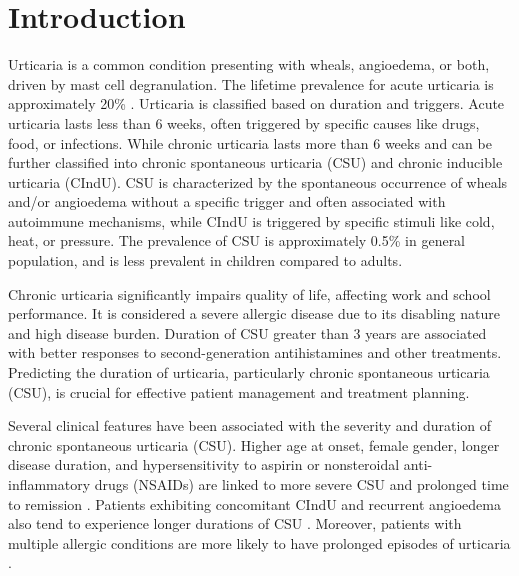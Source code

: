 \documentclass[final,3p,times,authoryear]{elsarticle}
\begin{document}
\sloppy %

\section{Introduction}\label{Introduction}

Urticaria is a common condition presenting with wheals, angioedema, or both, driven by mast cell degranulation\citep{Zuberbier2021The,RadonjicHoesli2018Urticaria,Ring2012Urticaria}. The lifetime prevalence for acute urticaria is approximately 20\% \citep{Zuberbier2021The}. Urticaria is classified based on duration and triggers. Acute urticaria lasts less than 6 weeks, often triggered by specific causes like drugs, food, or infections. While chronic urticaria lasts more than 6 weeks and can be further classified into chronic spontaneous urticaria (CSU) and chronic inducible urticaria (CIndU)\citep{Zuberbier2021The,Ring2012Urticaria}. CSU is characterized by the spontaneous occurrence of wheals and/or angioedema without a specific trigger and often associated with autoimmune mechanisms\citep{Schettini2023Urticaria}, while CIndU is triggered by specific stimuli like cold, heat, or pressure\citep{Pozderac2020Chronic}. The prevalence of CSU is approximately 0.5\% in general population, and is less prevalent in children compared to adults\citep{Balp2015The, Poddighe2019LETTER, Labbene2023Prevalence}. 

Chronic urticaria significantly impairs quality of life, affecting work and school performance. It is considered a severe allergic disease due to its disabling nature and high disease burden\citep{Zuberbier2021The}. Duration of CSU greater than 3 years are associated with better responses to second-generation antihistamines and other treatments\citep{Chiang2022Predictors}. Predicting the duration of urticaria, particularly chronic spontaneous urticaria (CSU), is crucial for effective patient management and treatment planning. 

Several clinical features have been associated with the severity and duration of chronic spontaneous urticaria (CSU). Higher age at onset, female gender, longer disease duration, and hypersensitivity to aspirin or nonsteroidal anti-inflammatory drugs (NSAIDs) are linked to more severe CSU and prolonged time to remission \citep{SanchezBorges2017Factors,Rabelo-Filardi2013Parameters}. Patients exhibiting concomitant CIndU and recurrent angioedema also tend to experience longer durations of CSU \citep{SanchezBorges2017Factors, Curto-Barredo2018Clinical}. Moreover, patients with multiple allergic conditions are more likely to have prolonged episodes of urticaria \citep{Lin2011Predictive}.
\end{document}
